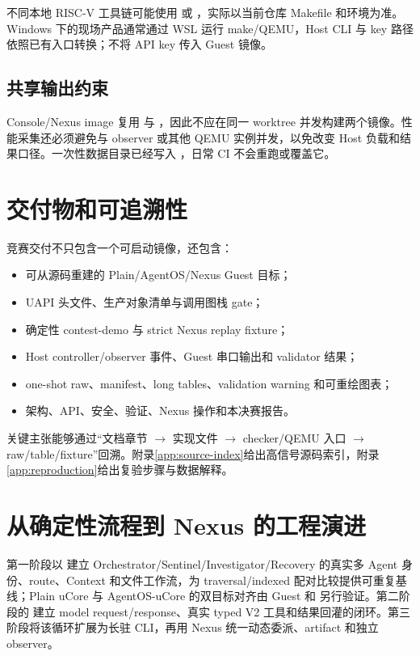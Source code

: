 不同本地 RISC-V 工具链可能使用  或 ，实际以当前仓库 Makefile 和环境为准。Windows 下的现场产品通常通过 WSL 运行 make/QEMU，Host CLI 与 key 路径依照已有入口转换；不将 API key 传入 Guest 镜像。

\subsection{共享输出约束}

Console/Nexus image 复用  与 ，因此不应在同一 worktree 并发构建两个镜像。性能采集还必须避免与 observer 或其他 QEMU 实例并发，以免改变 Host 负载和结果口径。一次性数据目录已经写入 ，日常 CI 不会重跑或覆盖它。

\section{交付物和可追溯性}

竞赛交付不只包含一个可启动镜像，还包含：

\begin{itemize}
  \item 可从源码重建的 Plain/AgentOS/Nexus Guest 目标；
  \item UAPI 头文件、生产对象清单与调用图栈 gate；
  \item 确定性 contest-demo 与 strict Nexus replay fixture；
  \item Host controller/observer 事件、Guest 串口输出和 validator 结果；
  \item one-shot raw、manifest、long tables、validation warning 和可重绘图表；
  \item 架构、API、安全、验证、Nexus 操作和本决赛报告。
\end{itemize}

关键主张能够通过“文档章节 $\rightarrow$ 实现文件 $\rightarrow$ checker/QEMU 入口 $\rightarrow$ raw/table/fixture”回溯。附录\ref{app:source-index}给出高信号源码索引，附录\ref{app:reproduction}给出复验步骤与数据解释。

\section{从确定性流程到 Nexus 的工程演进}

第一阶段以  建立 Orchestrator/Sentinel/Investigator/Recovery 的真实多 Agent 身份、route、Context 和文件工作流，为 traversal/indexed 配对比较提供可重复基线；Plain uCore 与 AgentOS-uCore 的双目标对齐由  Guest 和  另行验证。第二阶段的  建立 model request/response、真实 typed V2 工具和结果回灌的闭环。第三阶段将该循环扩展为长驻 CLI，再用 Nexus 统一动态委派、artifact 和独立 observer。

